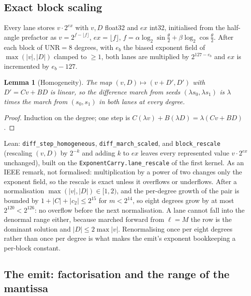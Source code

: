 \documentclass[usenatbib,useAMS]{mnras}
\newtheorem{lemma}{Lemma}
\begin{document}
\subsection{Exact block scaling}
\label{sec:scale}

Every lane stores $v\cdot2^{ex}$ with $v,D$ float32 and $ex$ int32, initialised from the half-angle prefactor as $v=2^{f-\lfloor f\rfloor}$, $ex=\lfloor f\rfloor$, $f=\alpha\log_2\sin\tfrac\theta2+\beta\log_2\cos\tfrac\theta2$. After each block of $\mathrm{UNR}=8$ degrees, with $e_b$ the biased exponent field of $\max(\lvert v\rvert,\lvert D\rvert)$ clamped to $\ge1$, both lanes are multiplied by $2^{127-e_b}$ and $ex$ is incremented by $e_b-127$.

\begin{lemma}[Homogeneity]
\label{lem:homog}
The map $(v,D)\mapsto(v+D',D')$ with $D'=Cv+BD$ is linear, so the difference march from seeds $(\lambda s_0,\lambda s_1)$ is $\lambda$ times the march from $(s_0,s_1)$ in both lanes at every degree.
\end{lemma}

\begin{proof}
Induction on the degree; one step is $C(\lambda v)+B(\lambda D)=\lambda(Cv+BD)$.
\end{proof}

Lean: \texttt{diff\_step\_homogeneous}, \texttt{diff\_march\_scaled}, and \texttt{block\_rescale} (rescaling $(v,D)$ by $2^{-k}$ and adding $k$ to $ex$ leaves every represented value $v\cdot2^{ex}$ unchanged), built on the \texttt{ExponentCarry.lane\_rescale} of the first kernel. As an IEEE remark, not formalised: multiplication by a power of two changes only the exponent field, so the rescale is exact unless it overflows or underflows. After a normalisation $\max(\lvert v\rvert,\lvert D\rvert)\in[1,2)$, and the per-degree growth of the pair is bounded by $1+\lvert C\rvert+\lvert c_2\rvert\le2^{15}$ for $m<2^{14}$, so eight degrees grow by at most $2^{120}<2^{126}$: no overflow before the next normalisation. A lane cannot fall into the denormal range either, because marched forward from $\ell=M$ the row is the dominant solution and $\lvert D\rvert\le2\max\lvert v\rvert$. Renormalising once per eight degrees rather than once per degree is what makes the emit's exponent bookkeeping a per-block constant.

\subsection{The emit: factorisation and the range of the mantissa}
\label{sec:emitv2}
\end{document}
